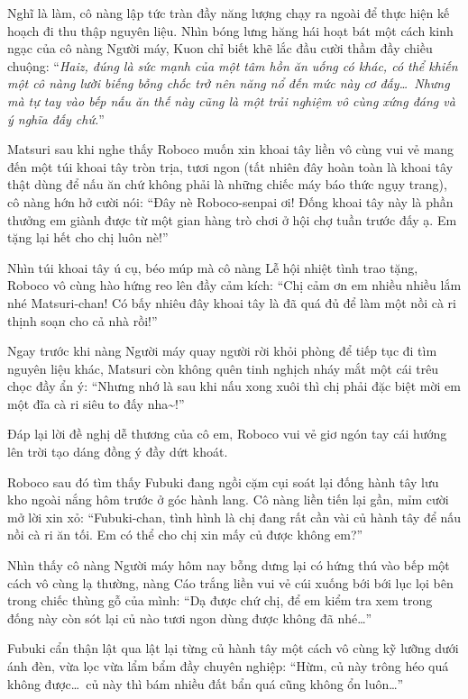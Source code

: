 \documentclass[../main.tex]{subfiles}
\begin{document}
Nghĩ là làm, cô nàng lập tức tràn đầy năng lượng chạy ra ngoài để thực hiện kế hoạch đi thu thập nguyên liệu. Nhìn bóng lưng hăng hái hoạt bát một cách kinh ngạc của cô nàng Người máy, Kuon chỉ biết khẽ lắc đầu cười thầm đầy chiều chuộng: ``\textit{Haiz, đúng là sức mạnh của một tâm hồn ăn uống có khác, có thể khiến một cô nàng lười biếng bỗng chốc trở nên năng nổ đến mức này cơ đấy\dots\ Nhưng mà tự tay vào bếp nấu ăn thế này cũng là một trải nghiệm vô cùng xứng đáng và ý nghĩa đấy chứ.}''

\ct

Matsuri sau khi nghe thấy Roboco muốn xin khoai tây liền vô cùng vui vẻ mang đến một túi khoai tây tròn trịa, tươi ngon (tất nhiên đây hoàn toàn là khoai tây thật dùng để nấu ăn chứ không phải là những chiếc máy báo thức ngụy trang), cô nàng hớn hở cười nói: ``Đây nè Roboco-senpai ơi! Đống khoai tây này là phần thưởng em giành được từ một gian hàng trò chơi ở hội chợ tuần trước đấy ạ. Em tặng lại hết cho chị luôn nè!''

Nhìn túi khoai tây ú cụ, béo múp mà cô nàng Lễ hội nhiệt tình trao tặng, Roboco vô cùng hào hứng reo lên đầy cảm kích: ``Chị cảm ơn em nhiều nhiều lắm nhé Matsuri-chan! Có bấy nhiêu đây khoai tây là đã quá đủ để làm một nồi cà ri thịnh soạn cho cả nhà rồi!''

Ngay trước khi nàng Người máy quay người rời khỏi phòng để tiếp tục đi tìm nguyên liệu khác, Matsuri còn không quên tinh nghịch nháy mắt một cái trêu chọc đầy ẩn ý: ``Nhưng nhớ là sau khi nấu xong xuôi thì chị phải đặc biệt mời em một đĩa cà ri siêu to đấy nha\~{}!''

Đáp lại lời đề nghị dễ thương của cô em, Roboco vui vẻ giơ ngón tay cái hướng lên trời tạo dáng đồng ý đầy dứt khoát.

\ct

Roboco sau đó tìm thấy Fubuki đang ngồi cặm cụi soát lại đống hành tây lưu kho ngoài nắng hôm trước ở góc hành lang. Cô nàng liền tiến lại gần, mỉm cười mở lời xin xỏ: ``Fubuki-chan, tình hình là chị đang rất cần vài củ hành tây để nấu nồi cà ri ăn tối. Em có thể cho chị xin mấy củ được không em?''

Nhìn thấy cô nàng Người máy hôm nay bỗng dưng lại có hứng thú vào bếp một cách vô cùng lạ thường, nàng Cáo trắng liền vui vẻ cúi xuống bới bới lục lọi bên trong chiếc thùng gỗ của mình: ``Dạ được chứ chị, để em kiểm tra xem trong đống này còn sót lại củ nào tươi ngon dùng được không đã nhé\dots''

Fubuki cẩn thận lật qua lật lại từng củ hành tây một cách vô cùng kỹ lưỡng dưới ánh đèn, vừa lọc vừa lẩm bẩm đầy chuyên nghiệp: ``Hừm, củ này trông héo quá không được\dots\ củ này thì bám nhiều đất bẩn quá cũng không ổn luôn\dots''
\end{document}

